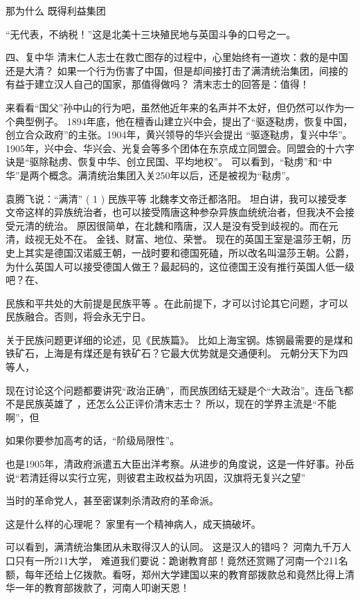 那为什么
既得利益集团

“无代表，不纳税！”这是北美十三块殖民地与英国斗争的口号之一。

四、复中华
清末仁人志士在救亡图存的过程中，心里始终有一道坎：救的是中国还是大清？
如果一个行为伤害了中国，但是却间接打击了满清统治集团，间接的有益于建立汉人自己的国家，那值得做吗？
清末志士的回答是：值得！

来看看“国父”孙中山的行为吧，虽然他近年来的名声并不太好，但仍然可以作为一个典型例子。
1894年底，他在檀香山建立兴中会，提出了“驱逐鞑虏，恢复中国，创立合众政府”的主张。1904年，黄兴领导的华兴会提出 “驱逐鞑虏，复兴中华”。
1905年，兴中会、华兴会、光复会等多个团体在东京成立同盟会。同盟会的十六字诀是“驱除鞑虏、恢复中华、创立民国、平均地权”。
可以看到，“鞑虏”和“中华”是两个概念。满清统治集团入关250年以后，还是被视为“鞑虏”。

袁腾飞说：“满清”
( 1 ) 民族平等
北魏孝文帝迁都洛阳。
坦白讲，我可以接受孝文帝这样的异族统治者，也可以接受隋唐这种参杂异族血统统治者，但我决不会接受元清的统治。
原因很简单，在北魏和隋唐，汉人是没有受到歧视的。而在元清，歧视无处不在。
金钱、财富、地位、荣誉。
现在的英国王室是温莎王朝，历史上其实是德国汉诺威王朝，一战时要和德国死磕，所以改名叫温莎王朝。公爵，为什么英国人可以接受德国人做王？最起码的，这位德国王没有推行英国人低一级吧？在、

民族和平共处的大前提是民族平等 。在此前提下，才可以讨论其它问题，才可以民族融合。否则，将会永无宁日。

关于民族问题更详细的论述，见《民族篇》。
比如上海宝钢。炼钢最需要的是煤和铁矿石，上海是有煤还是有铁矿石？它最大优势就是交通便利。
元朝分天下为四等人，

现在讨论这个问题都要讲究“政治正确”，而民族团结无疑是个“大政治”。连岳飞都不是民族英雄了 ，还怎么公正评价清末志士？
所以，现在的学界主流是“不能啊”，但

如果你要参加高考的话，“阶级局限性”。


也是1905年，清政府派遣五大臣出洋考察。从进步的角度说，这是一件好事。孙岳 说“若清廷得以实行立宪，则彼君主政权益为巩固，汉旗将无复兴之望”

当时的革命党人，甚至密谋刺杀清政府的革命派。

这是什么样的心理呢？
家里有一个精神病人，成天搞破坏。

可以看到，满清统治集团从未取得汉人的认同。
这是汉人的错吗？
河南九千万人口只有一所211大学，
难道我们要说：跪谢教育部！竟然还赏赐了河南一个211名额，每年还给上亿拨款。看呀，郑州大学建国以来的教育部拨款总和竟然比得上清华一年的教育部拨款了，河南人叩谢天恩！




